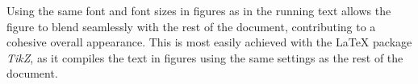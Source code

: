 


\noindent Using the same font and font sizes in figures as in the running text allows the figure to blend seamlessly with the rest of the document, contributing to a cohesive overall appearance.
This is most easily achieved with the \LaTeX{} package \emph{TikZ}, as it compiles the text in figures using the same settings as the rest of the document.

